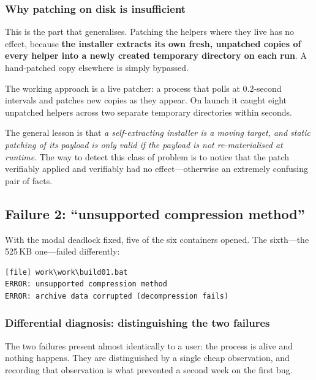 \subsubsection{Why patching on disk is insufficient}

This is the part that generalises. Patching the helpers where they live has no
effect, because \textbf{the installer extracts its own fresh, unpatched copies of
every helper into a newly created temporary directory on each run}. A
hand-patched copy elsewhere is simply bypassed.

The working approach is a live patcher: a process that polls at 0.2-second
intervals and patches new copies as they appear. On launch it caught eight
unpatched helpers across two separate temporary directories within seconds.

The general lesson is that \emph{a self-extracting installer is a moving target,
and static patching of its payload is only valid if the payload is not
re-materialised at runtime}. The way to detect this class of problem is to notice
that the patch verifiably applied and verifiably had no effect---otherwise an
extremely confusing pair of facts.

\subsection{Failure 2: ``unsupported compression method''}

With the modal deadlock fixed, five of the six containers opened. The sixth---the
525\,KB one---failed differently:

\begin{lstlisting}
[file] work\work\build01.bat
ERROR: unsupported compression method
ERROR: archive data corrupted (decompression fails)
\end{lstlisting}

\subsubsection{Differential diagnosis: distinguishing the two failures}

The two failures present almost identically to a user: the process is alive and
nothing happens. They are distinguished by a single cheap observation, and
recording that observation is what prevented a second week on the first bug.

